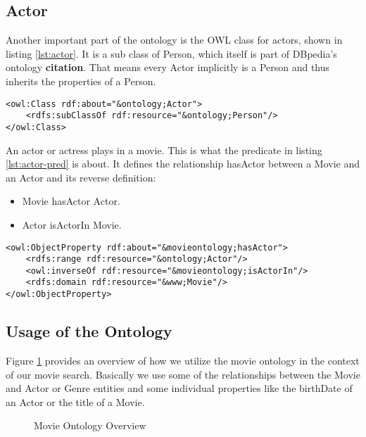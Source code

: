 \subsection{Actor}
Another important part of the ontology is the OWL class for actors, shown in listing \ref{lst:actor}. It is a sub class of Person, which itself is part of DBpedia's ontology \textbf{citation}. That means every Actor implicitly is a Person and thus inherits the properties of a Person.

\begin{lstlisting}[caption={OWL Actor Class in RDF/XML notation},label={lst:actor}]
<owl:Class rdf:about="&ontology;Actor">
	<rdfs:subClassOf rdf:resource="&ontology;Person"/>
</owl:Class>
\end{lstlisting}

An actor or actress plays in a movie. This is what the predicate in listing \ref{lst:actor-pred} is about. It defines the relationship hasActor between a Movie and an Actor and its reverse definition:
\begin{itemize}
	\item Movie hasActor Actor.
	\item Actor isActorIn Movie.
\end{itemize}

\begin{lstlisting}[caption={Exemplary Actor predicate in RDF/XML notation},label={lst:actor-pred}]
<owl:ObjectProperty rdf:about="&movieontology;hasActor">
	<rdfs:range rdf:resource="&ontology;Actor"/>
	<owl:inverseOf rdf:resource="&movieontology;isActorIn"/>
	<rdfs:domain rdf:resource="&www;Movie"/>
</owl:ObjectProperty>
\end{lstlisting}

\subsection{Usage of the Ontology}

Figure \ref{fig:movie-ont} provides an overview of how we utilize the movie ontology in the context of our movie search. Basically we use some of the relationships between the Movie and Actor or Genre entities and some individual properties like the birthDate of an Actor or the title of a Movie.

\begin{figure}[h]
	\centering
	\caption{Movie Ontology Overview}
	\label{fig:movie-ont}
\end{figure}


